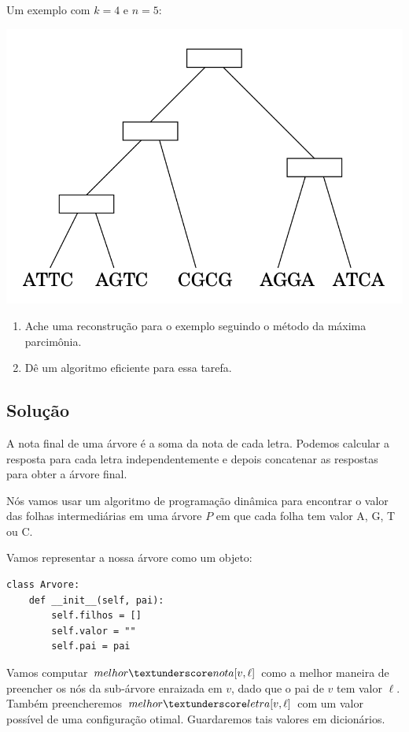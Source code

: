 \documentclass[11pt]{article}
\newcommand{\tu}{\textunderscore}
\begin{document}
Um exemplo com $k = 4$ e $n = 5$:

\href{http://github.com/adusca/FGV-EDA/6_30/tree.png}{\includegraphics[width=.9\linewidth]{tree.png}}

\begin{enumerate}
\item Ache uma reconstrução para o exemplo seguindo o método da
máxima parcimônia.
\item Dê um algoritmo eficiente para essa tarefa.
\end{enumerate}

\subsection{Solução}
\label{sec-2-2}

A nota final de uma árvore é a soma da nota de cada letra. Podemos
calcular a resposta para cada letra independentemente e depois
concatenar as respostas para obter a árvore final.

Nós vamos usar um algoritmo de programação dinâmica para encontrar o
valor das folhas intermediárias em uma árvore $P$ em que cada
folha tem valor A, G, T ou C.

Vamos representar a nossa árvore como um objeto:
\begin{verbatim}
class Arvore:
    def __init__(self, pai):
        self.filhos = []
        self.valor = ""
        self.pai = pai
\end{verbatim}

Vamos computar $melhor\tu nota[v, \ell]$ como a melhor maneira de
preencher os nós da sub-árvore enraizada em $v$, dado que o pai de $v$
tem valor $\ell$. Também preencheremos $melhor \tu letra[v, \ell]$ com um valor possível
de uma configuração otimal. Guardaremos tais valores em dicionários.
\end{document}
